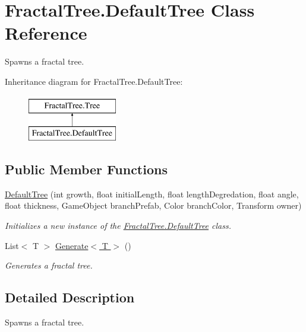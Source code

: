 \hypertarget{class_fractal_tree_1_1_default_tree}{}\section{Fractal\+Tree.\+Default\+Tree Class Reference}
\label{class_fractal_tree_1_1_default_tree}


Spawns a fractal tree.  


Inheritance diagram for Fractal\+Tree.\+Default\+Tree\+:\begin{figure}[H]
\begin{center}
\leavevmode
\includegraphics[height=2.000000cm]{class_fractal_tree_1_1_default_tree}
\end{center}
\end{figure}
\subsection*{Public Member Functions}
\begin{DoxyCompactItemize}
\item 
\hyperlink{class_fractal_tree_1_1_default_tree_adf83fe3bdb427d26f3353eaf069906fb}{Default\+Tree} (int growth, float initial\+Length, float length\+Degredation, float angle, float thickness, Game\+Object branch\+Prefab, Color branch\+Color, Transform owner)
\begin{DoxyCompactList}\small\item\em Initializes a new instance of the \hyperlink{class_fractal_tree_1_1_default_tree}{Fractal\+Tree.\+Default\+Tree} class. \end{DoxyCompactList}\item 
List$<$ T $>$ \hyperlink{class_fractal_tree_1_1_default_tree_a99f8ba1f24ba5693f0981be567b236a0}{Generate$<$ T $>$} ()
\begin{DoxyCompactList}\small\item\em Generates a fractal tree. \end{DoxyCompactList}\end{DoxyCompactItemize}


\subsection{Detailed Description}
Spawns a fractal tree. 




